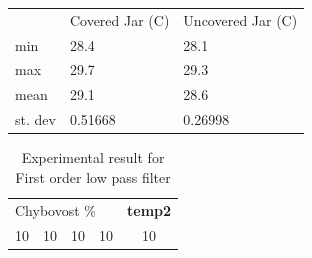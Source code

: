 \documentclass[a4paper, 12pt, english]{article}
\begin{document}
\begin{table}[]
	\begin{tabular}{lll}
		        & Covered Jar (\degree C) & Uncovered Jar (\degree C) \\
		min     & 28.4                    & 28.1                      \\
		max     & 29.7                    & 29.3                      \\
		mean    & 29.1                    & 28.6                      \\
		st. dev & 0.51668                 & 0.26998
	\end{tabular}
\end{table}
\begin{table}
	\caption[short]{\label{tab:Table 1} Experimental result for First order low pass filter}
	\centering
	\begin{tabular}{c c c c c}
		\toprule
		\multicolumn{4}{l|}{Chybovost \%} & \textbf{temp2}                \\
		\cmidrule[0.4pt](r{0.125em}){1-1}%
		\cmidrule[0.4pt](lr{0.125em}){2-2}%
		\cmidrule[0.4pt](lr{0.125em}){3-3}%
		\cmidrule[0.4pt](lr{0.125em}){4-4}%
		\cmidrule[0.4pt](lr{0.125em}){5-5}%
		10                                & 10             & 10 & 10 & 10

	\end{tabular}
\end{table}
\end{document}
